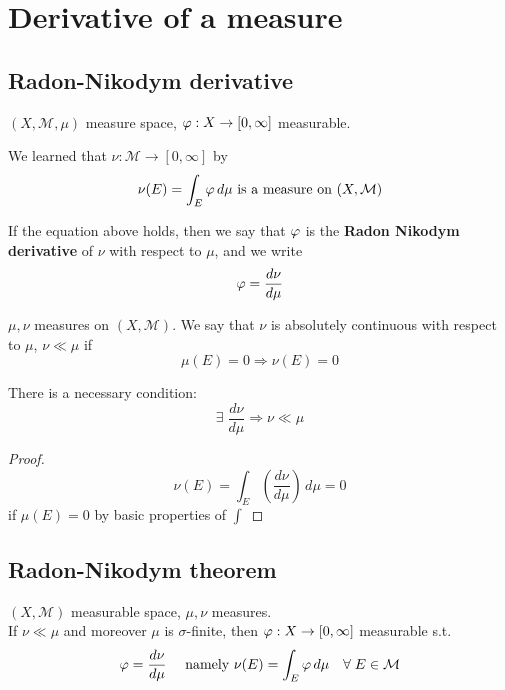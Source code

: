\newpage
\section{Derivative of a measure}
\subsection{Radon-Nikodym derivative}
\(\left(X, \mathcal{M}, \mu \right)\) measure space,
\(\oldphi : X \to \left[0, \infty \right]\) measurable.  

We learned that \(\nu: \mathcal{M} \to \left[0, \infty \right]\) by 
\[
    \nu(E)= \int_E \oldphi \, d\mu \mbox{ is a measure on }(X, \mathcal{M})
\] 

If the equation above holds, then we say that \(\oldphi\) is the \textbf{Radon Nikodym derivative} of \(\nu\) with respect to \(\mu\), and we write 
\[
    \oldphi = \frac{d\nu}{d\mu}
\]
\begin{definition}
    \(\mu, \nu  \) measures on \(\left(X, \mathcal{M}\right)\). 
    We say that \(\nu\) is absolutely continuous with respect to \(\mu\), \(\nu \ll \mu \) if 
    \[
        \mu(E) = 0 \Rightarrow \nu(E)=0
    \]
\end{definition}

\begin{lemma}
    There is a necessary condition:
    \[ 
        \exists \; \frac{d \nu}{d \mu} \Rightarrow \nu \ll \mu 
    \]
\end{lemma}

\begin{proof}
    \[
        \nu(E) = \int_E \left(\frac{d\nu}{d\mu}\right) \, d\mu = 0
    \] 
    if \(\mu(E)=0\) by basic properties of \(\int\)
\end{proof}
\subsection{Radon-Nikodym theorem}
\begin{theorem}
    \(\left(X, \mathcal{M}\right) \) measurable space, \(\mu, \nu\) measures. \\
    If \(\nu \ll \mu \) and moreover \(\mu \) is \(\sigma\)-finite, then \(\oldphi : X \to \left[0, \infty\right]\) measurable s.t.
    \[
        \oldphi = \frac{d \nu}{d \mu} \quad  \text{ namely } \nu(E)= \int_E \oldphi \, d\mu \quad \forall \; E \in \mathcal{M}
    \]
\end{theorem}


